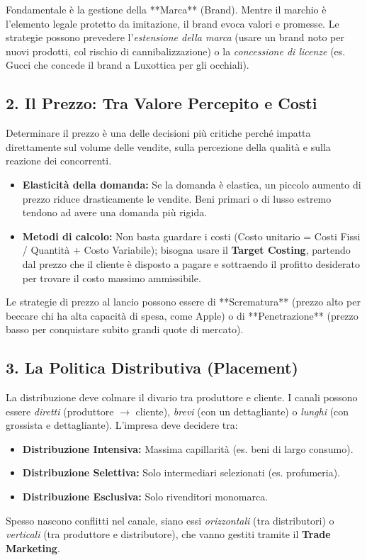 \documentclass[a4paper,10pt]{article}
\begin{document}
Fondamentale è la gestione della **Marca** (Brand). Mentre il marchio è l'elemento legale protetto da imitazione, il brand evoca valori e promesse. Le strategie possono prevedere l'\textit{estensione della marca} (usare un brand noto per nuovi prodotti, col rischio di cannibalizzazione) o la \textit{concessione di licenze} (es. Gucci che concede il brand a Luxottica per gli occhiali).

\subsection*{2. Il Prezzo: Tra Valore Percepito e Costi}

Determinare il prezzo è una delle decisioni più critiche perché impatta direttamente sul volume delle vendite, sulla percezione della qualità e sulla reazione dei concorrenti.
\begin{itemize}
    \item \textbf{Elasticità della domanda:} Se la domanda è elastica, un piccolo aumento di prezzo riduce drasticamente le vendite. Beni primari o di lusso estremo tendono ad avere una domanda più rigida.
    \item \textbf{Metodi di calcolo:} Non basta guardare i costi (Costo unitario = Costi Fissi / Quantità + Costo Variabile); bisogna usare il \textbf{Target Costing}, partendo dal prezzo che il cliente è disposto a pagare e sottraendo il profitto desiderato per trovare il costo massimo ammissibile.
\end{itemize}

Le strategie di prezzo al lancio possono essere di **Scrematura** (prezzo alto per beccare chi ha alta capacità di spesa, come Apple) o di **Penetrazione** (prezzo basso per conquistare subito grandi quote di mercato).

\subsection*{3. La Politica Distributiva (Placement)}

La distribuzione deve colmare il divario tra produttore e cliente. I canali possono essere \textit{diretti} (produttore $\rightarrow$ cliente), \textit{brevi} (con un dettagliante) o \textit{lunghi} (con grossista e dettagliante). 
L'impresa deve decidere tra:
\begin{itemize}
    \item \textbf{Distribuzione Intensiva:} Massima capillarità (es. beni di largo consumo).
    \item \textbf{Distribuzione Selettiva:} Solo intermediari selezionati (es. profumeria).
    \item \textbf{Distribuzione Esclusiva:} Solo rivenditori monomarca.
\end{itemize}
Spesso nascono conflitti nel canale, siano essi \textit{orizzontali} (tra distributori) o \textit{verticali} (tra produttore e distributore), che vanno gestiti tramite il \textbf{Trade Marketing}.
\end{document}
